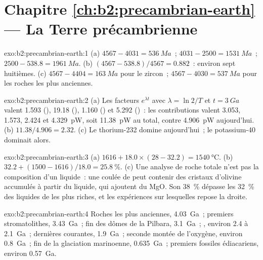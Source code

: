 \section*{Chapitre \ref{ch:b2:precambrian-earth} --- La Terre précambrienne}

\begin{solution}{exo:b2:precambrian-earth:1}
(a)  $4567 - 4031 = \qty{536}{Ma}$~;  $4031 - 2500 = \qty{1531}{Ma}$~;
 $2500 - 538.8 = \qty{1961}{Ma}$. (b) $(4567 - 538.8)/4567 = 0.882$~: environ sept
huitièmes. (c) $4567 - 4404 = \qty{163}{Ma}$ pour le zircon~; $4567 - 4030 = \qty{537}{Ma}$ pour
les roches les plus anciennes.
\end{solution}

\begin{solution}{exo:b2:precambrian-earth:2}
(a) Les facteurs $e^{\lambda t}$ avec $\lambda = \ln2/T$ et $t = \qty{3}{Ga}$ valent 1.593
(), 19.18 (), 1.160 () et 5.292 ()~: les
contributions valent 3.053, 1.573, 2.424 et \qty{4.329}{pW}, soit \qty{11.38}{pW} au total, contre
\qty{4.906}{pW} aujourd'hui. (b) $11.38/4.906 = 2.32$. (c) Le thorium-232 domine aujourd'hui~; le potassium-40 dominait
alors.
\end{solution}

\begin{solution}{exo:b2:precambrian-earth:3}
(a) $1616 + 18.0\times(28 - 32.2) = \qty{1540}{\celsius}$. (b) $32.2 + (1500 - 1616)/18.0 =
\qty{25.8}{\percent}$. (c) Une analyse de roche totale n'est pas la composition d'un liquide~: une
coulée de  peut contenir des cristaux d'olivine accumulés à partir du liquide, qui ajoutent du MgO. Son
\qty{38}{\percent} dépasse les \qty{32}{\percent} des liquides de  les plus riches, et
les expériences sur lesquelles repose la droite.
\end{solution}

\begin{solution}{exo:b2:precambrian-earth:4}
Roches les plus anciennes, \qty{4.03}{Ga}~; premiers stromatolithes, \qty{3.43}{Ga}~; fin des dômes de la Pilbara,
\qty{3.1}{Ga}~; , environ 2.4 à \qty{2.1}{Ga}~; dernières  courantes,
\qty{1.9}{Ga}~; seconde montée de l'oxygène, environ \qty{0.8}{Ga}~; fin de la glaciation marinoenne,
\qty{0.635}{Ga}~; premiers fossiles édiacariens, environ \qty{0.57}{Ga}.
\end{solution}


